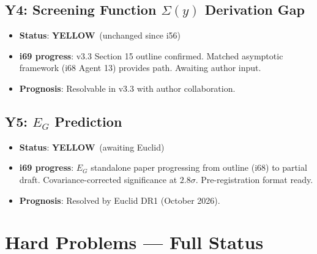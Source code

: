 \documentclass[11pt,a4paper]{article}
\newcommand{\YELLOW}{\textcolor{dfdyellow}{\textbf{YELLOW}}}
\begin{document}
\subsection{Y4: Screening Function $\Sigma(y)$ Derivation Gap}
\begin{itemize}[nosep]
\item \textbf{Status}: \YELLOW\ (unchanged since i56)
\item \textbf{i69 progress}: v3.3 Section 15 outline confirmed. Matched asymptotic framework (i68 Agent 13) provides path. Awaiting author input.
\item \textbf{Prognosis}: Resolvable in v3.3 with author collaboration.
\end{itemize}

\subsection{Y5: $E_G$ Prediction}
\begin{itemize}[nosep]
\item \textbf{Status}: \YELLOW\ (awaiting Euclid)
\item \textbf{i69 progress}: $E_G$ standalone paper progressing from outline (i68) to partial draft. Covariance-corrected significance at $2.8\sigma$. Pre-registration format ready.
\item \textbf{Prognosis}: Resolved by Euclid DR1 (October 2026).
\end{itemize}


\section{Hard Problems --- Full Status}
\end{document}
